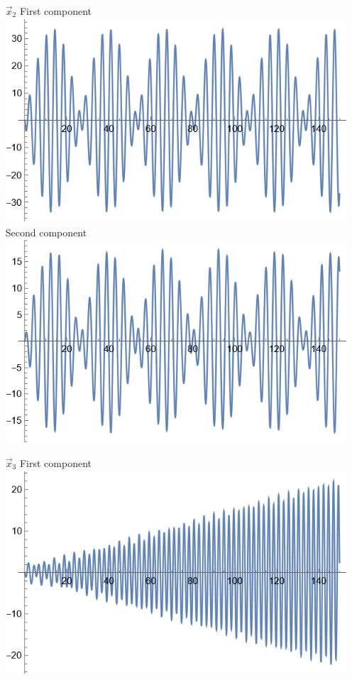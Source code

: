 \documentclass[12pt, letterpaper]{article}
\begin{document}
\begin{enumerate}
\begin{enumerate}
		\item[$\Vec{x}_2$] First component\\
		\includegraphics[scale=1.0]{x2com1.png}\\
		Second component\\
		\includegraphics[scale=1.0]{x2com2.png}
		\item[$\Vec{x}_3$] First component\\
		\includegraphics[scale=1.0]{x3com1.png}\\

\end{enumerate}
\end{enumerate}
\end{document}

